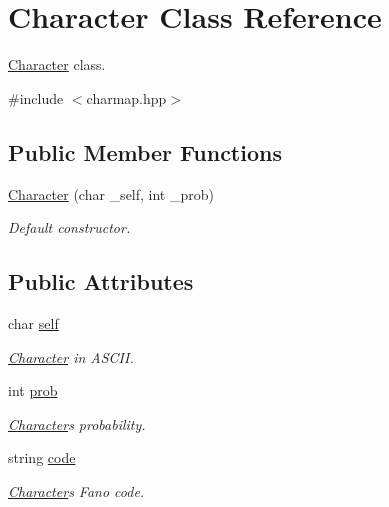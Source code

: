 \hypertarget{classCharacter}{}\section{Character Class Reference}
\label{classCharacter}


\hyperlink{classCharacter}{Character} class.  




{\ttfamily \#include $<$charmap.\+hpp$>$}

\subsection*{Public Member Functions}
\begin{DoxyCompactItemize}
\item 
\hyperlink{classCharacter_a3fd76e935d59466d5bbc412db331fa9b}{Character} (char \+\_\+self, int \+\_\+prob)
\begin{DoxyCompactList}\small\item\em Default constructor. \end{DoxyCompactList}\end{DoxyCompactItemize}
\subsection*{Public Attributes}
\begin{DoxyCompactItemize}
\item 
char \hyperlink{classCharacter_ab024781a886289e71df241093d75d326}{self}\hypertarget{classCharacter_ab024781a886289e71df241093d75d326}{}\label{classCharacter_ab024781a886289e71df241093d75d326}

\begin{DoxyCompactList}\small\item\em \hyperlink{classCharacter}{Character} in A\+S\+C\+II. \end{DoxyCompactList}\item 
int \hyperlink{classCharacter_a99f020cd77aba51eefa5c65fe7980018}{prob}\hypertarget{classCharacter_a99f020cd77aba51eefa5c65fe7980018}{}\label{classCharacter_a99f020cd77aba51eefa5c65fe7980018}

\begin{DoxyCompactList}\small\item\em \hyperlink{classCharacter}{Character}\textquotesingle{}s probability. \end{DoxyCompactList}\item 
string \hyperlink{classCharacter_af69ad5acab75152051fe565ecf6aa947}{code}\hypertarget{classCharacter_af69ad5acab75152051fe565ecf6aa947}{}\label{classCharacter_af69ad5acab75152051fe565ecf6aa947}

\begin{DoxyCompactList}\small\item\em \hyperlink{classCharacter}{Character}\textquotesingle{}s Fano code. \end{DoxyCompactList}\end{DoxyCompactItemize}


